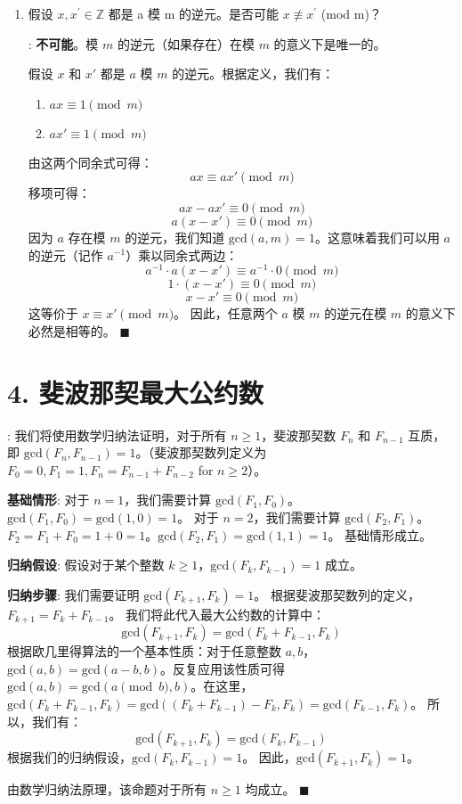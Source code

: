 \documentclass[11pt]{article}
\newenvironment{qparts}{\begin{enumerate}[{(}a{)}]}{\end{enumerate}}
\def\endproofmark{$\blacksquare$}
\newenvironment{proof}{\par\noindent{\bf 证明}:}{\endproofmark\smallskip}
\begin{document}
\begin{qparts}
\item 假设 $x,x^{\prime}\in\mathbb{Z}$ 都是 a 模 m 的逆元。是否可能 $x\not\equiv x^{\prime}$ (mod m)？

\begin{proof}
\textbf{不可能}。模 $m$ 的逆元（如果存在）在模 $m$ 的意义下是唯一的。

假设 $x$ 和 $x'$ 都是 $a$ 模 $m$ 的逆元。根据定义，我们有：
\begin{enumerate}
    \item $ax \equiv 1 \pmod{m}$
    \item $ax' \equiv 1 \pmod{m}$
\end{enumerate}
由这两个同余式可得：
\[ ax \equiv ax' \pmod{m} \]
移项可得：
\[ ax - ax' \equiv 0 \pmod{m} \]
\[ a(x - x') \equiv 0 \pmod{m} \]
因为 $a$ 存在模 $m$ 的逆元，我们知道 $\text{gcd}(a, m) = 1$。这意味着我们可以用 $a$ 的逆元（记作 $a^{-1}$）乘以同余式两边：
\[ a^{-1} \cdot a(x - x') \equiv a^{-1} \cdot 0 \pmod{m} \]
\[ 1 \cdot (x - x') \equiv 0 \pmod{m} \]
\[ x - x' \equiv 0 \pmod{m} \]
这等价于 $x \equiv x' \pmod{m}$。
因此，任意两个 $a$ 模 $m$ 的逆元在模 $m$ 的意义下必然是相等的。
\end{proof}
\end{qparts}

\newpage

\section*{4. 斐波那契最大公约数}
\begin{proof}
我们将使用数学归纳法证明，对于所有 $n \ge 1$，斐波那契数 $F_n$ 和 $F_{n-1}$ 互质，即 $\text{gcd}(F_n, F_{n-1}) = 1$。（斐波那契数列定义为 $F_0=0, F_1=1, F_n = F_{n-1} + F_{n-2}$ for $n \ge 2$）。

\textbf{基础情形}:
对于 $n=1$，我们需要计算 $\text{gcd}(F_1, F_0)$。
$\text{gcd}(F_1, F_0) = \text{gcd}(1, 0) = 1$。
对于 $n=2$，我们需要计算 $\text{gcd}(F_2, F_1)$。
$F_2 = F_1 + F_0 = 1+0=1$。$\text{gcd}(F_2, F_1) = \text{gcd}(1, 1) = 1$。
基础情形成立。

\textbf{归纳假设}:
假设对于某个整数 $k \ge 1$，$\text{gcd}(F_k, F_{k-1}) = 1$ 成立。

\textbf{归纳步骤}:
我们需要证明 $\text{gcd}(F_{k+1}, F_k) = 1$。
根据斐波那契数列的定义，$F_{k+1} = F_k + F_{k-1}$。
我们将此代入最大公约数的计算中：
\[ \text{gcd}(F_{k+1}, F_k) = \text{gcd}(F_k + F_{k-1}, F_k) \]
根据欧几里得算法的一个基本性质：对于任意整数 $a, b$，$\text{gcd}(a, b) = \text{gcd}(a-b, b)$。反复应用该性质可得 $\text{gcd}(a, b) = \text{gcd}(a \pmod b, b)$。在这里，$\text{gcd}(F_k + F_{k-1}, F_k) = \text{gcd}((F_k + F_{k-1}) - F_k, F_k) = \text{gcd}(F_{k-1}, F_k)$。
所以，我们有：
\[ \text{gcd}(F_{k+1}, F_k) = \text{gcd}(F_k, F_{k-1}) \]
根据我们的归纳假设，$\text{gcd}(F_k, F_{k-1}) = 1$。
因此，$\text{gcd}(F_{k+1}, F_k) = 1$。

由数学归纳法原理，该命题对于所有 $n \ge 1$ 均成立。
\end{proof}
\end{document}
